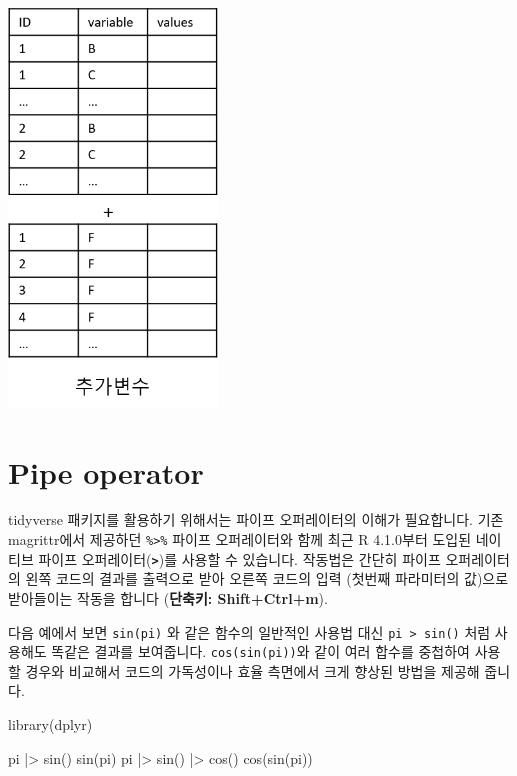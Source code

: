 \documentclass[
  a4paper,
]{book}
\newenvironment{Shaded}{\begin{snugshade}}{\end{snugshade}}
\newcommand{\FunctionTok}[1]{\textcolor[rgb]{0.28,0.35,0.67}{#1}}
\newcommand{\NormalTok}[1]{\textcolor[rgb]{0.00,0.23,0.31}{#1}}
\newcommand{\SpecialCharTok}[1]{\textcolor[rgb]{0.37,0.37,0.37}{#1}}
\begin{document}
\includegraphics[width=2.1875in,height=\textheight]{images/07/06.png}

\hypertarget{pipe-operator}{%
\section{Pipe operator}\label{pipe-operator}}

tidyverse 패키지를 활용하기 위해서는 파이프 오퍼레이터의 이해가
필요합니다. 기존 magrittr에서 제공하던 \texttt{\%\textgreater{}\%}
파이프 오퍼레이터와 함께 최근 R 4.1.0부터 도입된 네이티브 파이프
오퍼레이터(\textbf{\texttt{\textbar{}\textgreater{}}})를 사용할 수
있습니다. 작동법은 간단히 파이프 오퍼레이터의 왼쪽 코드의 결과를
출력으로 받아 오른쪽 코드의 입력 (첫번째 파라미터의 값)으로 받아들이는
작동을 합니다 (\textbf{단축키: Shift+Ctrl+m}).

다음 예에서 보면 \texttt{sin(pi)} 와 같은 함수의 일반적인 사용법 대신
\texttt{pi\ \textbar{}\textgreater{}\ sin()} 처럼 사용해도 똑같은 결과를
보여줍니다. \texttt{cos(sin(pi))}와 같이 여러 합수를 중첩하여 사용할
경우와 비교해서 코드의 가독성이나 효율 측면에서 크게 향상된 방법을
제공해 줍니다.

\begin{Shaded}
\begin{Highlighting}[]
\FunctionTok{library}\NormalTok{(dplyr)}

\NormalTok{pi }\SpecialCharTok{|\textgreater{}} \FunctionTok{sin}\NormalTok{()}
\FunctionTok{sin}\NormalTok{(pi)}
\NormalTok{pi }\SpecialCharTok{|\textgreater{}} \FunctionTok{sin}\NormalTok{() }\SpecialCharTok{|\textgreater{}} \FunctionTok{cos}\NormalTok{()}
\FunctionTok{cos}\NormalTok{(}\FunctionTok{sin}\NormalTok{(pi))}
\end{Highlighting}
\end{Shaded}
\end{document}

